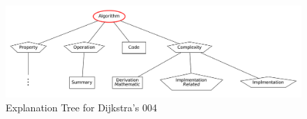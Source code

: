 \begin{figure}[H]
  \includegraphics[scale=0.2]{DJK_tree}
    
    
\caption{Explanation Tree for Dijkstra's 004}
\label{fig:djk-tree}
\end{figure}